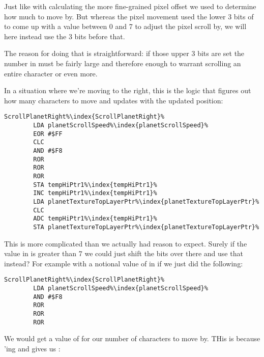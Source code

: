 Just like with calculating the more fine-grained pixel offset we used  to determine
how much to move by. But whereas the pixel movement used the lower 3 bits of  to come
up with a value between 0 and 7 to adjust the pixel scroll by, we will here instead use the 3 bits before that.

The reason for doing that is straightforward: if those upper 3 bits are set the number in 
must be fairly large and therefore enough to warrant scrolling an entire character or even more.

In a situation where we're moving to the right, this is the logic that figures out how many characters to move and
updates  with the updated position:

\begin{lstlisting}[escapechar=\%]
ScrollPlanetRight%\index{ScrollPlanetRight}%   
        LDA planetScrollSpeed%\index{planetScrollSpeed}%
        EOR #$FF
        CLC
        AND #$F8
        ROR
        ROR
        ROR
        STA tempHiPtr1%\index{tempHiPtr1}%
        INC tempHiPtr1%\index{tempHiPtr1}%
        LDA planetTextureTopLayerPtr%\index{planetTextureTopLayerPtr}%
        CLC
        ADC tempHiPtr1%\index{tempHiPtr1}%
        STA planetTextureTopLayerPtr%\index{planetTextureTopLayerPtr}%
\end{lstlisting}

This is more complicated than we actually had reason to expect. Surely if the value in  is
greater than 7 we could just shift the bits over there and use that instead? For example with a notional value of
 in  if we just did the following:

\begin{lstlisting}[escapechar=\%]
ScrollPlanetRight%\index{ScrollPlanetRight}%   
        LDA planetScrollSpeed%\index{planetScrollSpeed}%
        AND #$F8
        ROR
        ROR
        ROR
\end{lstlisting}

We would get a value of  for our number of characters to move by. THis is because 'ing
 and  gives us :


